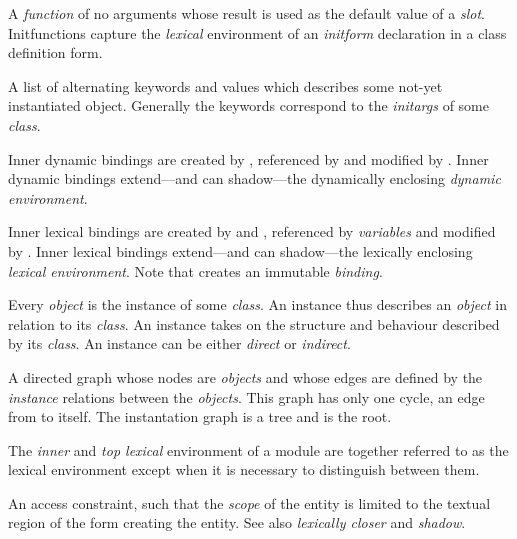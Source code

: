 \begin{optDefinition}
\begin{definitions}
      A {\em function} of
    no arguments whose result is used as the default value of a {\em slot}.
    Initfunctions capture the {\em lexical} environment of an {\em initform}
    declaration in a class definition form.

      A list of alternating
    keywords and values which describes some not-yet instantiated object.
    Generally the keywords correspond to the {\em initargs} of some {\em class}.

     Inner dynamic
    bindings are created by , referenced by
     and modified by .  Inner
    dynamic bindings extend---and can shadow---the dynamically enclosing {\em
        dynamic environment}.

     Inner lexical
    bindings are created by  and ,
    referenced by {\em variables} and modified by .  Inner
    lexical bindings extend---and can shadow---the lexically enclosing {\em
        lexical environment}.  Note that  creates an
    immutable {\em binding}.

      Every {\em object} is the
    instance of some {\em class}.  An instance thus describes an {\em object} in
    relation to its {\em class}.  An instance takes on the structure and
    behaviour described by its {\em class}.  An instance can be either {\em
        direct} or {\em indirect}.

      A
    directed graph whose nodes are {\em objects} and whose edges are defined by
    the {\em instance} relations between the {\em objects}.  This graph has only
    one cycle, an edge from  to itself.  The instantation graph
    is a tree and  is the root.

     The
    {\em inner} and {\em top lexical} environment of a module are together
    referred to as the lexical environment except when it is necessary to
    distinguish between them.

     An access
    constraint, such that the {\em scope} of the entity is limited to the
    textual region of the form creating the entity.  See also {\em lexically
        closer} and {\em shadow}.


\end{definitions}
\end{optDefinition}
